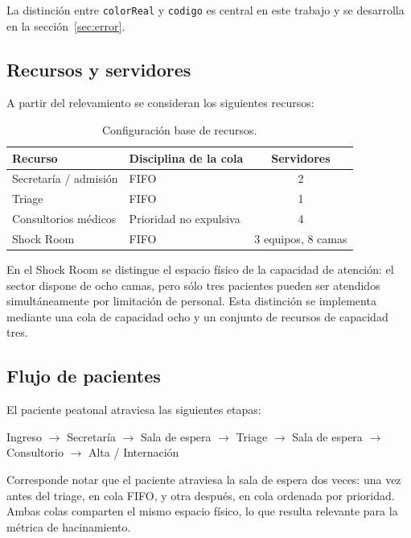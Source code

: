 \documentclass{article}
\begin{document}
La distinción entre \texttt{colorReal} y \texttt{codigo} es central en este
trabajo y se desarrolla en la sección~\ref{sec:error}.

\subsection{Recursos y servidores}

A partir del relevamiento se consideran los siguientes recursos:

\begin{table}[H]
\centering
\begin{tabular}{llc}
\toprule
\textbf{Recurso} & \textbf{Disciplina de la cola} & \textbf{Servidores} \\
\midrule
Secretaría / admisión   & FIFO                    & 2 \\
Triage                  & FIFO                    & 1 \\
Consultorios médicos    & Prioridad no expulsiva  & 4 \\
Shock Room              & FIFO                    & 3 equipos, 8 camas \\
\bottomrule
\end{tabular}
\caption{Configuración base de recursos.}
\label{tab:recursos}
\end{table}

En el Shock Room se distingue el espacio físico de la capacidad de atención:
el sector dispone de ocho camas, pero sólo tres pacientes pueden ser
atendidos simultáneamente por limitación de personal. Esta distinción se
implementa mediante una cola de capacidad ocho y un conjunto de recursos de
capacidad tres.

\subsection{Flujo de pacientes}

El paciente peatonal atraviesa las siguientes etapas:

\begin{center}
Ingreso $\rightarrow$ Secretaría $\rightarrow$ Sala de espera $\rightarrow$
Triage $\rightarrow$ Sala de espera $\rightarrow$ Consultorio $\rightarrow$
Alta / Internación
\end{center}

Corresponde notar que el paciente atraviesa la sala de espera dos veces: una
vez antes del triage, en cola FIFO, y otra después, en cola ordenada por
prioridad. Ambas colas comparten el mismo espacio físico, lo que resulta
relevante para la métrica de hacinamiento.
\end{document}
